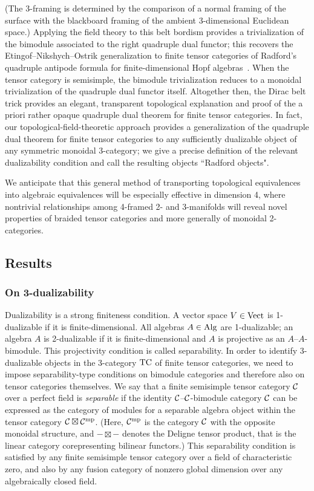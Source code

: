 \documentclass{amsart}
\begin{document}
(The 3-framing is determined by the comparison of a normal framing of the surface with the blackboard framing of the ambient 3-dimensional Euclidean space.)  Applying the field theory to this belt bordism provides a trivialization of the bimodule associated to the right quadruple dual functor; this recovers the Etingof--Nikshych--Ostrik generalization to finite tensor categories of Radford's quadruple antipode formula for finite-dimensional Hopf algebras~\cite{MR2097289, MR2183279, MR0407069}.  When the tensor category is semisimple, the bimodule trivialization reduces to a monoidal trivialization of the quadruple dual functor itself.  Altogether then, the Dirac belt trick provides an elegant, transparent topological explanation and proof of the a priori rather opaque quadruple dual theorem for finite tensor categories.  In fact, our topological-field-theoretic approach provides a generalization of the quadruple dual theorem for finite tensor categories to any sufficiently dualizable object of any symmetric monoidal 3-category; we give a precise definition of the relevant dualizability condition and call the resulting objects ``Radford objects".

We anticipate that this general method of transporting topological equivalences into algebraic equivalences will be especially effective in dimension 4, where nontrivial relationships among 4-framed 2- and 3-manifolds will reveal novel properties of braided tensor categories and more generally of monoidal 2-categories.





\subsection{Results}

\subsubsection{On 3-dualizability}

Dualizability is a strong finiteness condition.  A vector space $V \in \mathrm{Vect}$ is 1-dualizable if it is finite-dimensional.  All algebras $A \in \mathrm{Alg}$ are 1-dualizable; an algebra $A$ is 2-dualizable if it is finite-dimensional and $A$ is projective as an $A$--$A$-bimodule.  This projectivity condition is called separability.  In order to identify 3-dualizable objects in the 3-category $\mathrm{TC}$ of finite tensor categories, we need to impose separability-type conditions on bimodule categories and therefore also on tensor categories themselves.  We say that a finite semisimple tensor category $\mathcal C$ over a perfect field is \emph{separable} if the identity $\mathcal C$--$\mathcal C$-bimodule category $\mathcal C$ can be expressed as the category of modules for a separable algebra object within the tensor category $\mathcal C \boxtimes \mathcal C^{\mathrm{mp}}$.  (Here, $\mathcal C^{\mathrm{mp}}$ is the category $\mathcal C$ with the opposite monoidal structure, and $- \boxtimes -$ denotes the Deligne tensor product, that is the linear category corepresenting bilinear functors.)  This separability condition is satisfied by any finite semisimple tensor category over a field of characteristic zero, and also by any fusion category of nonzero global dimension over any algebraically closed field.
\end{document}

